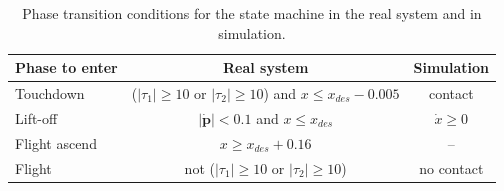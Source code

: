 \documentclass[onecolumn, letter paper]{report}
\begin{document}
\begin{table}[htb!]
    \centering
    \caption{Phase transition conditions for the state machine in the real system and in simulation.}
    \begin{tabular}{lc|c}
        \textbf{Phase to enter}&\textbf{Real system}&\textbf{Simulation}  \\ \hline
         Touchdown & ($|\tau_1| \geq 10$ or $|\tau_2| \geq 10$) and $x \leq x_{des}-0.005$ & contact \\
         Lift-off & $|\pmb{\dot p}| < 0.1$ and $x \leq x_{des}$   & $\dot x \geq 0$\\
         Flight ascend & $x \geq x_{des} + 0.16$ & -- \\
         Flight &  not ($|\tau_1| \geq 10$ or $|\tau_2| \geq 10$) & no contact
    \end{tabular}
    \label{tab:conditions}
\end{table}
\end{document}
